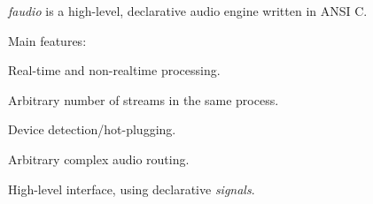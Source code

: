 {\itshape faudio} is a high-\/level, declarative audio engine written in A\-N\-S\-I C.

Main features\-:


\begin{DoxyItemize}
\item Real-\/time and non-\/realtime processing.
\item Arbitrary number of streams in the same process.
\item Device detection/hot-\/plugging.
\item Arbitrary complex audio routing.
\item High-\/level interface, using declarative {\itshape signals}. 
\end{DoxyItemize}